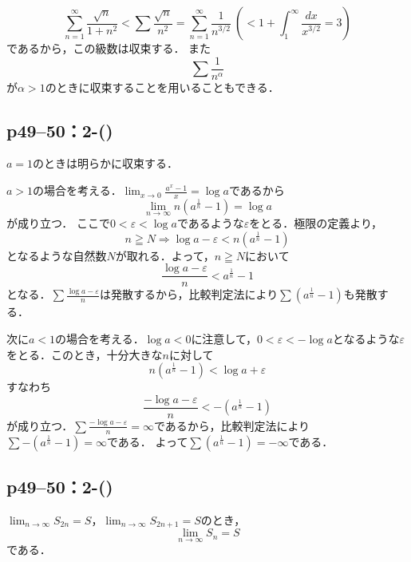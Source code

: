 \begin{screen}
    \[
        \sum ^{\infty}_{n=1}\frac{\sqrt{n}}{1+n^2}<\sum \frac{\sqrt{n}}{n^2}=\sum^{\infty}_{n=1}\frac{1}{n^{3/2}}~\left(<1+\int^{\infty}_{1}\frac{dx}{x^{3/2}}=3\right)
    \]
    であるから，この級数は収束する．
    また
    \[
        \sum \frac{1}{n^\alpha}
    \]
    が$\alpha >1$のときに収束することを用いることもできる．
\end{screen}


\subsection*{p49--50：2-()}

\begin{screen}
    $a=1$のときは明らかに収束する．

    $a>1$の場合を考える．$\lim_{x \to 0} \frac{a^x-1}{x} = \log a$であるから
    \[
        \lim_{n \to \infty} n(a^{\frac{1}{n}}-1) = \log a
    \]
    が成り立つ．
    ここで$0 < \varepsilon <\log a$であるような$\varepsilon$をとる．極限の定義より，
    \[
        n \geqq N \Longrightarrow \log a - \varepsilon < n (a^\frac{1}{n}-1)
    \]
    となるような自然数$N$が取れる．よって，$n \geqq N$において
    \[
        \frac{\log a - \varepsilon}{n} < a^\frac{1}{n}-1
    \]
    となる．$\sum \frac{\log a - \varepsilon}{n}$は発散するから，比較判定法により$\sum (a^{\frac{1}{n}}-1)$も発散する．

    次に$ a<1$の場合を考える．$\log a <0$に注意して，$0 < \varepsilon <-\log a $となるような$\varepsilon$をとる．このとき，十分大きな$n$に対して
    \[
        n (a^\frac{1}{n}-1) < \log a + \varepsilon
    \]
    すなわち
    \[
        \frac{-\log a - \varepsilon}{n} < -(a^\frac{1}{n}-1)
    \]
    が成り立つ．$\sum \frac{-\log a - \varepsilon}{n}=\infty$であるから，比較判定法により$\sum -(a^{\frac{1}{n}}-1)=\infty$である．
    よって$\sum (a^{\frac{1}{n}}-1)=-\infty$である．
\end{screen}


\subsection*{p49--50：2-()}


$\lim_{n \to \infty} S_{2n}=S$，$\lim_{n \to \infty} S_{2n+1}=S$のとき，
\[
    \lim_{n \to \infty} S_n = S
\]
である．

